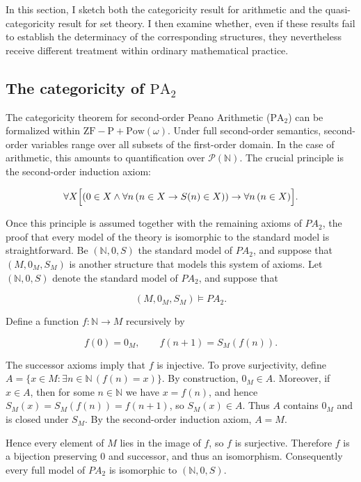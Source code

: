 \documentclass[11pt,a4paper]{book}
\theoremstyle{plain}
\begin{document}
In this section, I sketch both the categoricity result for arithmetic and the quasi-categoricity result for set theory. I then examine whether, even if these results fail to establish the determinacy of the corresponding structures, they nevertheless receive different treatment within ordinary mathematical practice.

\subsection{The categoricity of \texorpdfstring{$\mathrm{PA}_2$}{PA2}}

The categoricity theorem for second-order Peano Arithmetic ($\mathrm{PA}_2$) can be formalized within $\mathrm{ZF\!-\!P}+\mathrm{Pow}(\omega)$. Under full second-order semantics, second-order variables range over all subsets of the first-order domain. In the case of arithmetic, this amounts to quantification over $\mathcal{P}(\mathbb{N})$. The crucial principle is the second-order induction axiom:

\[
\forall X\Bigl[(0\in X \wedge \forall n\,(n\in X \rightarrow S(n)\in X))
\rightarrow \forall n\,(n\in X)\Bigr].
\]

Once this principle is assumed together with the remaining axioms of $PA_2$, the proof that every model of the theory is isomorphic to the standard model is straightforward.  Be $(\mathbb{N},0,S)$ the standard model of $PA_2$, and suppose that $(M,0_M, S_M)$ is another structure that models this system of axioms. Let $(\mathbb{N},0,S)$ denote the standard model of $PA_2$, and suppose that

\[
(M,0_M,S_M)\models PA_2.
\]

Define a function $f:\mathbb{N}\to M$ recursively by

\[
f(0)=0_M,
\qquad
f(n+1)=S_M(f(n)).
\]

The successor axioms imply that $f$ is injective. To prove surjectivity, define $A=\{x\in M:\exists n\in\mathbb{N}\,(f(n)=x)\}$. By construction, $0_M\in A$. Moreover, if $x\in A$, then for some $n\in\mathbb{N}$ we have $x=f(n)$, and hence $S_M(x) = S_M(f(n)) = f(n+1)$, so $S_M(x)\in A$. Thus $A$ contains $0_M$ and is closed under $S_M$. By the second-order induction axiom, $
A=M$.

Hence every element of $M$ lies in the image of $f$, so $f$ is surjective. Therefore $f$ is a bijection preserving $0$ and successor, and thus an isomorphism. Consequently every full model of $PA_2$ is isomorphic to $(\mathbb{N},0,S)$.
\end{document}
